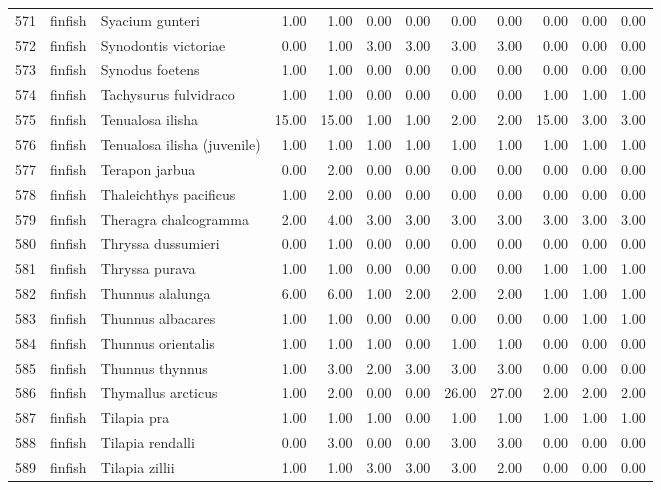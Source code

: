 \begin{table}[ht]
\begin{tabular}{rllrrrrrrrrr}
  571 & finfish & Syacium gunteri & 1.00 & 1.00 & 0.00 & 0.00 & 0.00 & 0.00 & 0.00 & 0.00 & 0.00 \\ 
  572 & finfish & Synodontis victoriae & 0.00 & 1.00 & 3.00 & 3.00 & 3.00 & 3.00 & 0.00 & 0.00 & 0.00 \\ 
  573 & finfish & Synodus foetens & 1.00 & 1.00 & 0.00 & 0.00 & 0.00 & 0.00 & 0.00 & 0.00 & 0.00 \\ 
  574 & finfish & Tachysurus fulvidraco & 1.00 & 1.00 & 0.00 & 0.00 & 0.00 & 0.00 & 1.00 & 1.00 & 1.00 \\ 
  575 & finfish & Tenualosa ilisha & 15.00 & 15.00 & 1.00 & 1.00 & 2.00 & 2.00 & 15.00 & 3.00 & 3.00 \\ 
  576 & finfish & Tenualosa ilisha (juvenile) & 1.00 & 1.00 & 1.00 & 1.00 & 1.00 & 1.00 & 1.00 & 1.00 & 1.00 \\ 
  577 & finfish & Terapon jarbua & 0.00 & 2.00 & 0.00 & 0.00 & 0.00 & 0.00 & 0.00 & 0.00 & 0.00 \\ 
  578 & finfish & Thaleichthys pacificus & 1.00 & 2.00 & 0.00 & 0.00 & 0.00 & 0.00 & 0.00 & 0.00 & 0.00 \\ 
  579 & finfish & Theragra chalcogramma & 2.00 & 4.00 & 3.00 & 3.00 & 3.00 & 3.00 & 3.00 & 3.00 & 3.00 \\ 
  580 & finfish & Thryssa dussumieri & 0.00 & 1.00 & 0.00 & 0.00 & 0.00 & 0.00 & 0.00 & 0.00 & 0.00 \\ 
  581 & finfish & Thryssa purava & 1.00 & 1.00 & 0.00 & 0.00 & 0.00 & 0.00 & 1.00 & 1.00 & 1.00 \\ 
  582 & finfish & Thunnus alalunga & 6.00 & 6.00 & 1.00 & 2.00 & 2.00 & 2.00 & 1.00 & 1.00 & 1.00 \\ 
  583 & finfish & Thunnus albacares & 1.00 & 1.00 & 0.00 & 0.00 & 0.00 & 0.00 & 0.00 & 1.00 & 1.00 \\ 
  584 & finfish & Thunnus orientalis & 1.00 & 1.00 & 1.00 & 0.00 & 1.00 & 1.00 & 0.00 & 0.00 & 0.00 \\ 
  585 & finfish & Thunnus thynnus & 1.00 & 3.00 & 2.00 & 3.00 & 3.00 & 3.00 & 0.00 & 0.00 & 0.00 \\ 
  586 & finfish & Thymallus arcticus & 1.00 & 2.00 & 0.00 & 0.00 & 26.00 & 27.00 & 2.00 & 2.00 & 2.00 \\ 
  587 & finfish & Tilapia pra & 1.00 & 1.00 & 1.00 & 0.00 & 1.00 & 1.00 & 1.00 & 1.00 & 1.00 \\ 
  588 & finfish & Tilapia rendalli & 0.00 & 3.00 & 0.00 & 0.00 & 3.00 & 3.00 & 0.00 & 0.00 & 0.00 \\ 
  589 & finfish & Tilapia zillii & 1.00 & 1.00 & 3.00 & 3.00 & 3.00 & 2.00 & 0.00 & 0.00 & 0.00 \\ 

\end{tabular}
\end{table}
